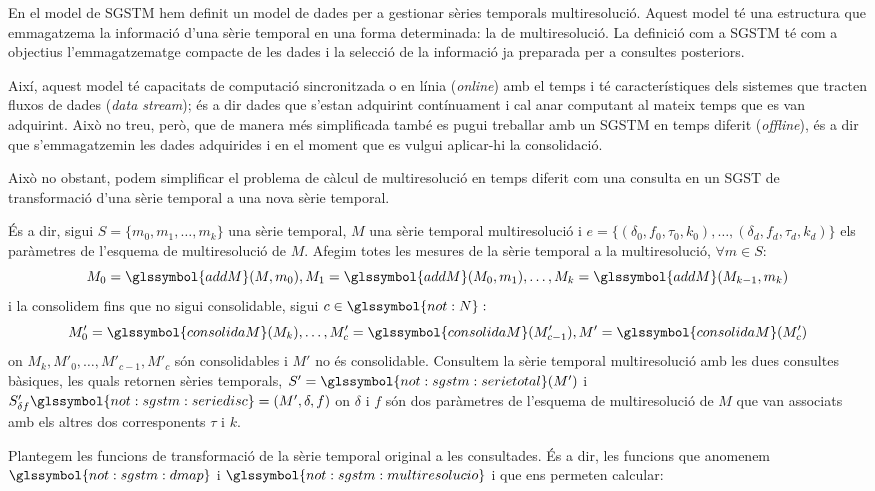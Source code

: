 En el model de \gls{SGSTM} hem definit un model de dades per a
gestionar sèries temporals multiresolució. Aquest model té una
estructura que emmagatzema la informació d'una sèrie temporal en una
forma determinada: la de multiresolució.  La definició com a
\gls{SGSTM} té com a objectius l'emmagatzematge compacte de les dades
i la selecció de la informació ja preparada per a consultes
posteriors.

Així, aquest model té capacitats de computació
sincronitzada o en línia (\emph{online}) amb el temps i té
característiques dels sistemes que tracten fluxos de dades (\emph{data
  stream}); és a dir dades que s'estan adquirint contínuament i cal
anar computant al mateix temps que es van adquirint. Això no treu,
però, que de manera més simplificada també es pugui treballar amb un
\gls{SGSTM} en temps diferit (\emph{offline}), és a dir que
s'emmagatzemin les dades adquirides i en el moment que es vulgui
aplicar-hi la consolidació.




Això no obstant, podem simplificar el problema de càlcul de
multiresolució en temps diferit com una consulta en un \gls{SGST} de
transformació d'una sèrie temporal a una nova sèrie temporal.


És a dir, sigui $S=\{m_0,m_1,\dotsc,m_k\}$ una sèrie temporal, $M$ una
sèrie temporal multiresolució i $e = \{ (\delta_0,f_0,\tau_0,k_0),
\ldots, (\delta_d,f_d,\tau_d,k_d)\}$ els paràmetres de l'esquema de
multiresolució de $M$. Afegim totes les mesures de la sèrie temporal a
la multiresolució, $\forall m \in S:$
\[
M_0=\glssymbol{addM}(M,m_0),M_1=\glssymbol{addM}(M_0,m_1),\dotsc,M_k=\glssymbol{addM}(M_{k-1},m_k)
\]
i la consolidem fins que no sigui consolidable, sigui
$c\in\glssymbol{not:N}:$
\[
M'_0=\glssymbol{consolidaM}(M_k),\dotsc,M'_{c}=\glssymbol{consolidaM}(M'_{c-1}),M'=\glssymbol{consolidaM}(M'_{c})
\]
on $M_k,M'_{0},\dotsc,M'_{c-1},M'_{c}$ són consolidables i $M'$ no és
consolidable.  Consultem la sèrie temporal multiresolució amb les dues
consultes bàsiques, les quals retornen sèries temporals,
$S'=\glssymbol{not:sgstm:serietotal}(M')$ i $S_{\delta
  f}'\glssymbol{not:sgstm:seriedisc}=(M',\delta,f)$ on $\delta$ i $f$
són dos paràmetres de l'esquema de multiresolució de $M$ que van
associats amb els altres dos corresponents $\tau$ i $k$.



Plantegem les funcions de transformació de la sèrie temporal original
a les consultades. És a dir, les funcions que anomenem
$\glssymbol{not:sgstm:dmap}$ i $\glssymbol{not:sgstm:multiresolucio}$
i que ens permeten calcular:

